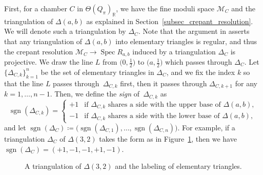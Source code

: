 \documentclass[pdftex]{sigma}
\numberwithin{equation}{section}
\theoremstyle{definition}
\newcommand{\RR}{\mathbb{R}}
\newcommand{\calM}{\mathcal{M}}
\newcommand{\Spec}{\operatorname{Spec}}
\newcommand{\sgn}{\operatorname{sgn}}
\newcommand{\perm}{\pi}
\begin{document}
First, for a chamber $C$ in $\Theta(Q_\perm)_\RR$, we have the fine moduli space $\calM_C$
and the triangulation of $\Delta(a,b)$ as explained in Section~\ref{subsec_crepant_resolution}. We will denote such a triangulation by $\Delta_C$.
Note that the argument in \cite[Section~3]{dais2001all} asserts that any triangulation of $\Delta(a,b)$ into elementary triangles is regular,
and thus the crepant resolution $\calM_C\to \Spec R_{a,b}$ induced by a triangulation $\Delta_C$ is projective.
We draw the line $L$ from $\bigl(0,\frac{1}{2}\bigr)$ to $\bigl(a,\frac{1}{2}\bigr)$ which passes through $\Delta_C$.
Let $\{\Delta_{C,k}\}_{k=1}^n$ be the set of elementary triangles in $\Delta_C$,
and we fix the index $k$ so that the line $L$ passes through~$\Delta_{C,k}$ first, then it passes through $\Delta_{C,k+1}$ for any $k=1, \dots, n-1$.
Then, we define the \emph{sign} of~$\Delta_{C,k}$ as
\[
\sgn(\Delta_{C,k})=
\begin{cases}
+1 & \text{if $\Delta_{C,k}$ shares a side with the upper base of $\Delta(a,b)$},\\
-1 & \text{if $\Delta_{C,k}$ shares a side with the lower base of $\Delta(a,b)$},
\end{cases}
\]
and let $\sgn(\Delta_C)\coloneqq \big(\sgn(\Delta_{C,1}), \dots, \sgn(\Delta_{C,n})\big)$.
For example, if a triangulation $\Delta_C$ of $\Delta(3,2)$ takes the form as in Figure~\ref{fig_sgn_triangulation},
then we have $\sgn(\Delta_C)=(+1, -1, -1, +1, -1)$.

\begin{figure}[!ht]
\centering
{}
\vspace{-2mm}

\caption{A triangulation of $\Delta(3,2)$ and the labeling of elementary triangles.}
\label{fig_sgn_triangulation}
\end{figure}
\end{document}
